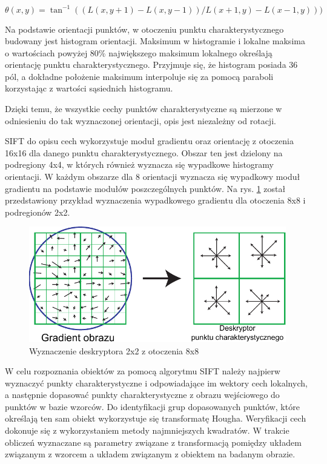 \begin{equation} 
\label{sift_orientation} 
\theta(x, y) = \tan^{-1}((L(x, y + 1) - L(x, y - 1))/L(x + 1, y) - L(x - 1, y)))
\end{equation}

Na podstawie orientacji punktów, w otoczeniu punktu charakterystycznego budowany jest histogram orientacji. Maksimum w histogramie i lokalne maksima o wartościach powyżej 80\% największego maksimum lokalnego określają orientację punktu charakterystycznego. Przyjmuje się, że histogram posiada 36 pól, a dokładne położenie maksimum interpoluje się za pomocą paraboli korzystając z wartości sąsiednich histogramu.

Dzięki temu, że wszystkie cechy punktów charakterystyczne są mierzone w odniesieniu do tak wyznaczonej orientacji,	opis jest niezależny od rotacji.

SIFT do opisu cech wykorzystuje moduł gradientu oraz orientację z otoczenia 16x16 dla danego punktu charakterystycznego. Obszar ten jest dzielony na podregiony 4x4, w których również wyznacza się wypadkowe histogramy orientacji. W każdym obszarze dla 8 orientacji wyznacza się wypadkowy moduł gradientu na podstawie modułów poszczególnych punktów. Na rys. \ref{fig:sift-descriptor} został przedstawiony przykład wyznaczenia wypadkowego gradientu dla otoczenia 8x8 i podregionów 2x2.

\begin{figure}[h]
	\centering
	\includegraphics[scale=1]{graphics/01_podstawy_teoretyczne/sift-descriptor.pdf}
	\caption{Wyznaczenie deskryptora 2x2 z otoczenia 8x8 \cite{LOWE04}}
	\label{fig:sift-descriptor}
\end{figure}

W celu rozpoznania obiektów za pomocą algorytmu SIFT należy najpierw wyznaczyć punkty charakterystyczne i odpowiadające im wektory cech lokalnych, a następnie dopasować punkty charakterystyczne z obrazu wejściowego do punktów w bazie wzorców. Do identyfikacji grup dopasowanych punktów, które określają ten sam obiekt wykorzystuje się transformatę Hougha. Weryfikacji cech dokonuje się z wykorzystaniem metody najmniejszych kwadratów. W trakcie obliczeń wyznaczane są parametry związane z transformacją pomiędzy układem związanym z wzorcem a układem związanym z obiektem na badanym obrazie.

